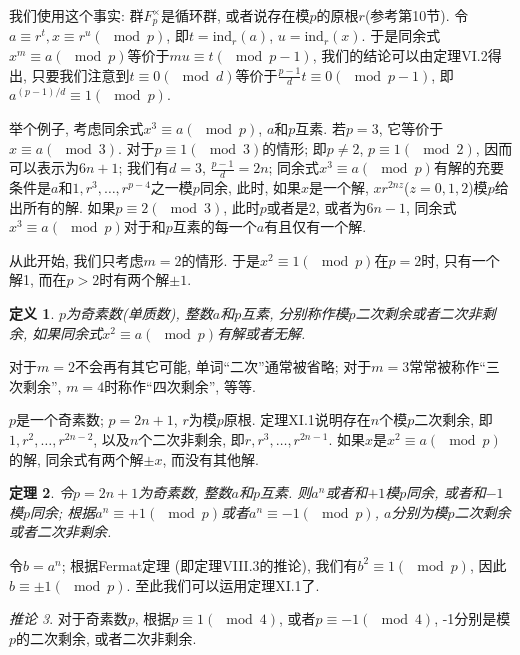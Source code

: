 \documentclass[12pt,a4paper]{book} %
\newtheorem{theorem}{定理}
\newtheorem{definition}[theorem]{定义}
\theoremstyle{remark}
\theoremstyle{example}
\theoremstyle{lemma}
\theoremstyle{corollary}
\newtheorem{corollary}[theorem]{推论}
\numberwithin{theorem}{chapter}
\begin{document}
我们使用这个事实: 群$F_{p}^{\times}$是循环群, 或者说存在模$p$的原根$r$(参考第10节). 令$a \equiv r^t, x \equiv r^u (\mod p)$, 即$t = \text{ind}_r(a)$, $u = \text{ind}_r(x)$. 于是同余式$x^m \equiv a (\mod p)$等价于$mu \equiv t (\mod p - 1)$, 我们的结论可以由定理VI.2得出, 只要我们注意到$t \equiv 0 (\mod d)$等价于$\frac{p - 1}{d}t \equiv 0 (\mod p - 1)$, 即$a^{(p - 1) / d} \equiv 1 (\mod p)$.

举个例子, 考虑同余式$x^3 \equiv a (\mod p)$, $a$和$p$互素. 若$p = 3$, 它等价于$x \equiv a (\mod 3)$. 对于$p \equiv 1 (\mod 3)$的情形; 即$p \neq 2$, $p \equiv 1 (\mod 2)$, 因而可以表示为$6n + 1$; 我们有$d = 3$, $\frac{p - 1}{d} = 2n$; 同余式$x^3 \equiv a (\mod p)$有解的充要条件是$a$和$1, r^3, \ldots, r^{p - 4}$之一模$p$同余, 此时, 如果$x$是一个解, $xr^{2nz}$($z = 0, 1, 2$)模$p$给出所有的解. 如果$p \equiv 2 (\mod 3)$, 此时$p$或者是2, 或者为$6n - 1$, 同余式$x^3 \equiv a (\mod p)$对于和$p$互素的每一个$a$有且仅有一个解.

从此开始, 我们只考虑$m = 2$的情形. 于是$x^2 \equiv 1 (\mod p)$在$p = 2$时, 只有一个解1, 而在$p > 2$时有两个解$\pm 1$.

\begin{definition}
$p$为奇素数(单质数), 整数$a$和$p$互素, 分别称作模$p$二次剩余或者二次非剩余, 如果同余式$x^2 \equiv a (\mod p)$有解或者无解.
\end{definition}

对于$m = 2$不会再有其它可能, 单词``二次''通常被省略; 对于$m = 3$常常被称作``三次剩余'', $m = 4$时称作``四次剩余'', 等等.

$p$是一个奇素数; $p = 2n + 1$, $r$为模$p$原根. 定理XI.1说明存在$n$个模$p$二次剩余, 即$1, r^2, \ldots, r^{2n - 2}$, 以及$n$个二次非剩余, 即$r, r^3, \ldots, r^{2n - 1}$. 如果$x$是$x^2 \equiv a (\mod p)$的解, 同余式有两个解$\pm x$, 而没有其他解.

\begin{theorem}
令$p = 2n + 1$为奇素数, 整数$a$和$p$互素. 则$a^n$或者和$+1$模$p$同余, 或者和$-1$模$p$同余; 根据$a^n \equiv +1 (\mod p)$或者$a^n \equiv -1 (\mod p)$, $a$分别为模$p$二次剩余或者二次非剩余.
\end{theorem}

令$b = a^n$; 根据Fermat定理 (即定理VIII.3的推论), 我们有$b^2 \equiv 1 (\mod p)$, 因此$b \equiv \pm 1(\mod p)$. 至此我们可以运用定理XI.1了.

\begin{corollary}
对于奇素数$p$, 根据$p \equiv 1 (\mod 4)$, 或者$p \equiv -1 (\mod 4)$, -1分别是模$p$的二次剩余, 或者二次非剩余.
\end{corollary}
\end{document}
